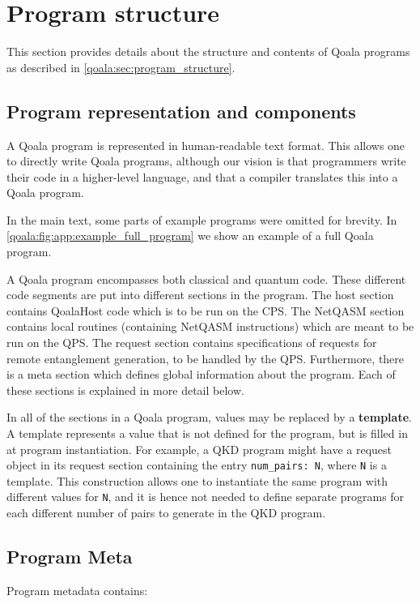 \section{Program structure}
\label{qoala:sec:app:program_structure}
This section provides details about the structure and contents of Qoala programs as described in \cref{qoala:sec:program_structure}.


\subsection{Program representation and components}
A Qoala program is represented in human-readable text format.
This allows one to directly write Qoala programs, although our vision is that programmers write their code in a higher-level language, and that a compiler translates this into a Qoala program.

In the main text, some parts of example programs were omitted for brevity.
In \cref{qoala:fig:app:example_full_program} we show an example of a full Qoala program.

A Qoala program encompasses both classical and quantum code.
These different code segments are put into different sections in the program.
The host section contains QoalaHost code which is to be run on the CPS.
The NetQASM section contains local routines (containing NetQASM instructions) which are meant to be run on the QPS.
The request section contains specifications of requests for remote entanglement generation, to be handled by the QPS.
Furthermore, there is a meta section which defines global information about the program.
Each of these sections is explained in more detail below.

In all of the sections in a Qoala program, values may be replaced by a \textbf{template}.
A template represents a value that is not defined for the program, but is filled in at program instantiation. For example, a QKD program might have a request object in its request section containing the entry \texttt{num\_pairs: {N}}, where \texttt{{N}} is a template. This construction allows one to instantiate the same program with different values for \texttt{N}, and it is hence not needed to define separate programs for each different number of pairs to generate in the QKD program.

\subsection{Program Meta}
Program metadata contains:

